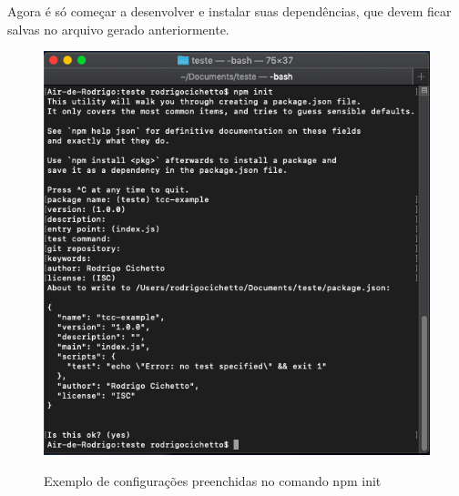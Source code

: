 \documentclass[
	12pt,				%
	openright,			%
	twoside,			%
	a4paper,			%
	english,			%
	brazil				%
	]{abntex2}
\begin{document}
\begin{anexosenv}
Agora é só começar a desenvolver e instalar suas dependências, que devem ficar salvas no arquivo gerado anteriormente.

\begin{figure}[h]
	\centering

  \caption{Exemplo de configurações preenchidas no comando npm init} \label{fig:NpmInitExample}
    \includegraphics[scale=0.5]{npm-init-example} \\

\end{figure}






\end{anexosenv}

\printindex
\end{document}
